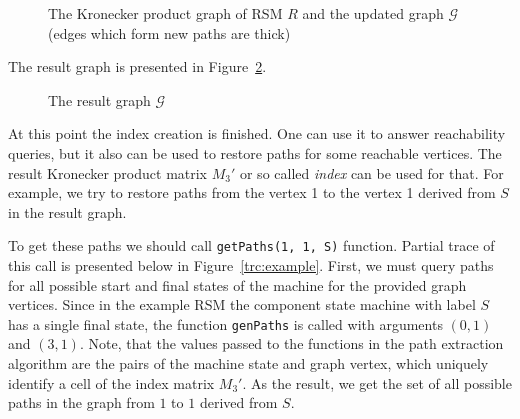 \begin{figure}[h]
    \centering
    \caption{The Kronecker product graph of RSM $R$ and the updated graph $\mathcal{G}$ (edges which form new paths are thick)}
    \label{fig:example_2_product}
\end{figure}
The result graph is presented in Figure~\ref{fig:example_result}.
\begin{figure}[h]
    \centering
    \caption{The result graph $\mathcal{G}$}
    \label{fig:example_result}
\end{figure}


At this point the index creation is finished.
One can use it to answer reachability queries, but it also can be used
to restore paths for some reachable vertices. The result Kronecker product matrix
$M_3'$ or so called \textit{index} can be used for that. For example, we try to
restore paths from the vertex 1 to the vertex 1 derived from $S$ in the result graph.

To get these paths we should call \verb|getPaths(1, 1, S)| function.
Partial trace of this call is presented below in Figure~\ref{trc:example}.
First, we must query paths for all possible start and final states of the
machine for the provided graph vertices. Since in the example RSM the component
state machine with label $S$ has a single final state, the function
\verb|genPaths| is called with arguments $(0,1)$ and $(3,1)$.
Note, that the values passed to the functions in the path extraction algorithm are the
pairs of the machine state and graph vertex, which uniquely identify a cell of
the index matrix $M_3'$. As the result,
we get the set of all possible paths in the graph from $1$ to $1$ derived from $S$.

